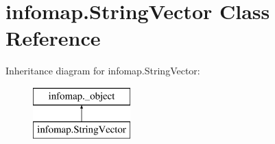 \hypertarget{classinfomap_1_1StringVector}{}\section{infomap.\+String\+Vector Class Reference}
\label{classinfomap_1_1StringVector}
Inheritance diagram for infomap.\+String\+Vector\+:\begin{figure}[H]
\begin{center}
\leavevmode
\includegraphics[height=2.000000cm]{classinfomap_1_1StringVector}
\end{center}
\end{figure}
